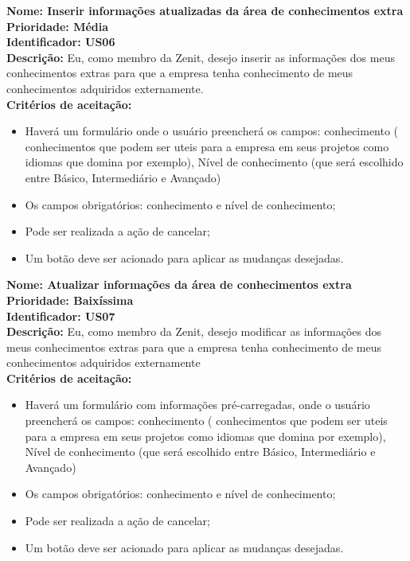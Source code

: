 \begin{anexosenv}
\indent \textbf{Nome: Inserir informações atualizadas da área de conhecimentos extra\\
    \indent Prioridade: Média\\
    \indent Identificador: US06\\
    \indent Descrição:} Eu, como membro da Zenit, desejo inserir as informações dos meus conhecimentos extras para que a empresa tenha conhecimento de meus conhecimentos adquiridos externamente.\\
\indent \textbf{Critérios de aceitação:}
\begin{itemize}
    \item Haverá um formulário onde o usuário preencherá os campos: conhecimento                     ( conhecimentos que podem ser uteis para a empresa em seus projetos como idiomas que domina por exemplo), Nível de conhecimento (que será escolhido entre Básico, Intermediário e Avançado)
    \item Os campos obrigatórios: conhecimento e nível de conhecimento;
    \item Pode ser realizada a ação de cancelar;
    \item Um botão deve ser acionado para aplicar as mudanças desejadas.
\end{itemize}

\indent \textbf{Nome: Atualizar informações da área de conhecimentos extra\\
    \indent Prioridade: Baixíssima\\
    \indent Identificador: US07\\
    \indent Descrição:} Eu, como membro da Zenit, desejo modificar as informações dos meus conhecimentos extras para que a empresa tenha conhecimento de meus conhecimentos adquiridos externamente \\
\indent \textbf{Critérios de aceitação:}
\begin{itemize}
    \item Haverá um formulário com informações pré-carregadas, onde o usuário preencherá os campos: conhecimento ( conhecimentos que podem ser uteis para a empresa em seus projetos como idiomas que domina por exemplo), Nível de conhecimento (que será escolhido entre Básico, Intermediário e Avançado)
    \item Os campos obrigatórios: conhecimento e nível de conhecimento;
    \item Pode ser realizada a ação de cancelar;
    \item Um botão deve ser acionado para aplicar as mudanças desejadas.
\end{itemize}


\end{anexosenv}
